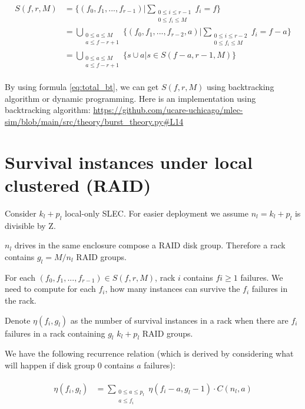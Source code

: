 \documentclass{article}
\begin{document}
\begin{eqnarray}
\begin{aligned}
  S(f,r,M)
  &= \{(f_0, f_1, ..., f_{r-1}) | \sum_{\substack{0 \leq i \leq r-1 \\ 0 \leq f_i \leq M}}f_i=f\} \\
    &= \bigcup_{\substack{0 \leq a \leq M \\ a \leq f-r+1}} \{(f_0, f_1, ..., f_{r-2}, a) | \sum_{\substack{0 \leq i \leq r-2 \\ 0 \leq f_i \leq M}}f_i=f-a\} \\
    &= \bigcup_{\substack{0 \leq a \leq M \\ a \leq f-r+1}} \{s \cup a | s \in S(f-a, r-1, M) \}
\end{aligned}
\label{eq:total_bt}
\end{eqnarray}



By using formula \ref{eq:total_bt}, we can get $S(f,r,M)$ using backtracking algorithm or dynamic programming. Here is an implementation using backtracking algorithm: \url{https://github.com/ucare-uchicago/mlec-sim/blob/main/src/theory/burst_theory.py#L14}

\section{Survival instances under local clustered (RAID)}\label{sec-raid}

Consider $k_l+p_l$ local-only SLEC. For easier deployment we assume $n_l=k_l+p_l$ is divisible by Z.

$n_l$ drives in the same enclosure compose a RAID disk group. Therefore a rack contains $g_l = M/n_l$ RAID groups.

For each $(f_0, f_1, ..., f_{r-1}) \in S(f,r,M)$, rack $i$ contains $fi\geq1$ failures. We need to compute for each $f_i$, how many instances can survive the $f_i$ failures in the rack.

Denote $\eta(f_i, g_l)$ as the number of survival instances in a rack when there are $f_i$ failures in a rack containing $g_l$ $k_l+p_l$ RAID groups.

We have the following recurrence relation (which is derived by considering what will happen if disk group 0 contains $a$ failures):

\begin{eqnarray}
\begin{aligned}
  \eta(f_i, g_l) &= \sum_{\substack{0 \leq a \leq p_l \\ a\leq f_i}} \eta(f_i-a, g_l-1) \cdot C(n_l, a)
\end{aligned}
\label{eq:raid:1}
\end{eqnarray}
\end{document}

